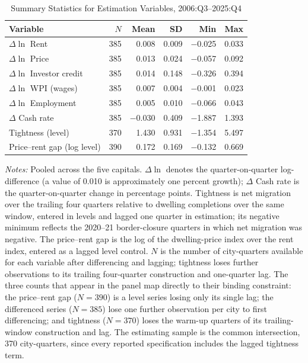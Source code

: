 \documentclass[preprint,11pt,authoryear]{elsarticle}
\begin{document}
\begin{table}[!htbp]
\centering
\footnotesize
\caption{Summary Statistics for Estimation Variables, 2006:Q3--2025:Q4}
\label{tab:est_summary}
\begin{threeparttable}
\setlength{\tabcolsep}{6pt}
\begin{tabular*}{\textwidth}{@{\extracolsep{\fill}}lrrrrr@{}}
\toprule
Variable & $N$ & Mean & SD & Min & Max \\
\midrule
$\Delta \ln$ Rent              & 385 & 0.008 & 0.009 & $-$0.025 & 0.033 \\
$\Delta \ln$ Price             & 385 & 0.013 & 0.024 & $-$0.057 & 0.092 \\
$\Delta \ln$ Investor credit   & 385 & 0.014 & 0.148 & $-$0.326 & 0.394 \\
$\Delta \ln$ WPI (wages)       & 385 & 0.007 & 0.004 & $-$0.001 & 0.023 \\
$\Delta \ln$ Employment        & 385 & 0.005 & 0.010 & $-$0.066 & 0.043 \\
$\Delta$ Cash rate             & 385 & $-$0.030 & 0.409 & $-$1.887 & 1.393 \\
Tightness (level)              & 370 & 1.430 & 0.931 & $-$1.354 & 5.497 \\
Price--rent gap (log level)    & 390 & 0.172 & 0.169 & $-$0.132 & 0.669 \\
\bottomrule
\end{tabular*}
\begin{tablenotes}[flushleft]
\scriptsize
\item \textit{Notes:} Pooled across the five capitals. $\Delta \ln$
denotes the quarter-on-quarter log-difference (a value of 0.010 is
approximately one percent growth); $\Delta$ Cash rate is the
quarter-on-quarter change in percentage points. Tightness is net
migration over the trailing four quarters relative to dwelling
completions over the same window, entered in levels and lagged one
quarter in estimation; its negative minimum reflects the 2020--21
border-closure quarters in which net migration was negative. The
price--rent gap is the log of the dwelling-price index over the rent
index, entered as a lagged level control. $N$ is the number of
city-quarters available for each variable after differencing and lagging;
tightness loses further observations to its trailing four-quarter
construction and one-quarter lag. The three counts that appear in the
panel map directly to their binding constraint: the price--rent gap
($N=390$) is a level series losing only its single lag; the differenced
series ($N=385$) lose one further observation per city to first
differencing; and tightness ($N=370$) loses the warm-up quarters of its
trailing-window construction and lag. The estimating sample is the
common intersection, 370 city-quarters, since every reported
specification includes the lagged tightness term.
\end{tablenotes}
\end{threeparttable}
\end{table}
\end{document}
